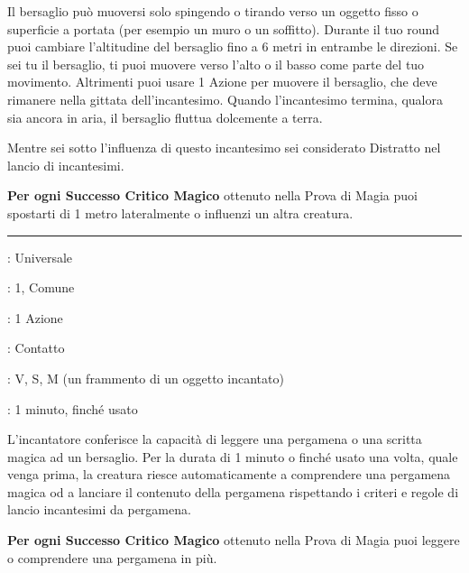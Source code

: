 \begin{multicols}{2}
Il bersaglio può muoversi solo spingendo o tirando verso un oggetto fisso o superficie a portata (per esempio un muro o un soffitto). Durante il tuo round puoi cambiare l'altitudine del bersaglio fino a 6 metri in entrambe le direzioni. Se sei tu il bersaglio, ti puoi muovere verso l'alto o il basso come parte del tuo movimento. Altrimenti puoi usare 1 Azione per muovere il bersaglio, che deve rimanere nella gittata dell'incantesimo. Quando l'incantesimo termina, qualora sia ancora in aria, il bersaglio fluttua dolcemente a terra.

Mentre sei sotto l'influenza di questo incantesimo sei considerato Distratto nel lancio di incantesimi.

\textbf{Per ogni Successo Critico Magico} ottenuto nella Prova di Magia puoi spostarti di 1 metro lateralmente o influenzi un altra creatura.

\smallskip\noindent\rule{\linewidth}{2pt} \hypertarget{Lettura del Magico}{}\smallskip{}
\noindent
\begin{description}[noitemsep, topsep=0pt, parsep=0pt, partopsep=0pt, leftmargin=0cm, labelwidth=2.8cm]
	\item[\textbf{Lista di Magia}]: Universale
	\item[\textbf{Livello}]: 1, Comune
	\item[\textbf{T. di Lancio}]: 1 Azione
	\item[\textbf{Gittata}]: Contatto
	\item[\textbf{Componenti}]: V, S, M (un frammento di un oggetto incantato)
	\item[\textbf{Durata}]: 1 minuto, finché usato
\end{description}

L'incantatore conferisce la capacità di leggere una pergamena o una scritta magica ad un bersaglio. Per la durata di 1 minuto o finché usato una volta, quale venga prima, la creatura riesce automaticamente a comprendere una pergamena magica od a lanciare il contenuto della pergamena rispettando i criteri e regole di lancio incantesimi da pergamena.

\textbf{Per ogni Successo Critico Magico} ottenuto nella Prova di Magia puoi leggere o comprendere una pergamena in più.


\end{multicols}
